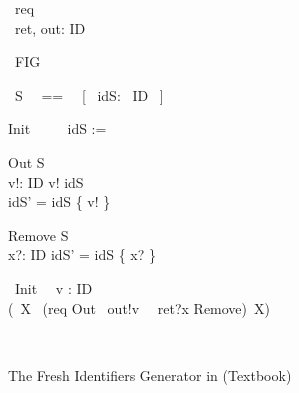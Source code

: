 \documentclass[11pt,a4paper]{article}
\begin{document}
\begin{figure}[h]
\begin{zed}
    [ID]
\end{zed}
\vspace{-.8cm}
\begin{circus}
    \circchannel\ req\\
    \circchannel\ ret, out: ID
\end{circus}
\vspace{-.9cm}
\begin{circus}
    \circprocess\ FIG ~~\circdef~~ \circbegin\
\end{circus}
\vspace{-1.0cm}
\begin{circusaction}
     \circstate\ S ~~==~~ [~ idS: \power~ID  ~]   
 \end{circusaction}
 \vspace{-1.0cm}
 \begin{circusaction}
     Init ~~\circdef~~ idS := \emptyset
 \end{circusaction}%
\vspace{-1.2cm}
\begin{multicols}{2}
\begin{schema}{Out}
     \Delta S \\
      v!: ID
 \where
    v! \notin idS \\ 
    idS' = idS \cup \{ v! \}
 \end{schema}%
\begin{schema}{Remove}
     \Delta S \\
      x?: ID
 \where
     idS' = idS \setminus \{ x? \}
 \end{schema}%
\end{multicols}
\vspace{-.5cm}
 \begin{circusaction}
     \circspot\ Init \circseq\ \circvar\ v : ID \circspot\ \\
  (\circmu\ X \circspot\ (req \then Out \circseq\ out!v \then \Skip\ \extchoice\ ret?x \then Remove)\circseq\ X)
 \end{circusaction}
\vspace{-.9cm}
 \begin{circus}
     \circend\
 \end{circus}
\vspace{-1cm}
\caption{\label{figure:Fig} The Fresh Identifiers Generator in (Textbook) \Circus\ }
\end{figure}
\end{document}
